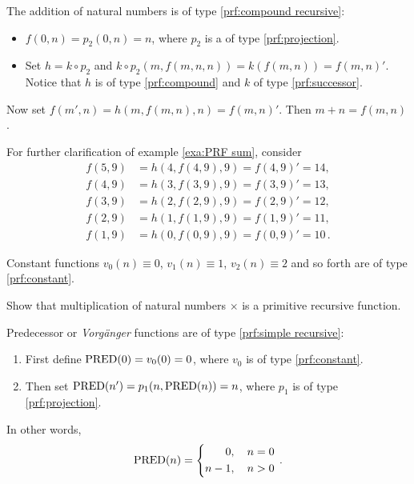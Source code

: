 \documentclass[11pt,a4paper]{article}
\begin{document}
\begin{example}[II]\label{exa:PRF sum}
    The addition of natural numbers is
    of type \eqref{prf:compound recursive}:
    \begin{itemize}
        \item \(f(0,n) = p_2(0,n) = n\), where \(p_2\)
            is a \PRF{} of type \eqref{prf:projection}.
        \item
            Set \(h = k\circ p_2\) and
            \(k\circ p_2(m,f(m,n,n)) = k(f(m,n)) = f(m,n)'\).
            Notice that \(h\) is of type \eqref{prf:compound}
            and \(k\) of type \eqref{prf:successor}.
    \end{itemize}
    Now set \(f(m',n) = h(m, f(m,n),n) = f(m,n)'\).
    Then \(m+n = f(m,n)\).
\end{example}

For further clarification of example \ref{exa:PRF sum}, consider
\begin{align*}
    f(5,9) &= h(4,f(4,9),9) = f(4,9)' = 14, \\
    f(4,9) &= h(3,f(3,9),9) = f(3,9)' = 13, \\
    f(3,9) &= h(2,f(2,9),9) = f(2,9)' = 12, \\
    f(2,9) &= h(1,f(1,9),9) = f(1,9)' = 11, \\
    f(1,9) &= h(0,f(0,9),9) = f(0,9)' = 10 \,.
\end{align*}

\begin{example}[III]\label{exa:PRF constant}
    Constant functions \(v_0(n)\equiv 0\),
    \(v_1(n)\equiv 1\), \(v_2(n)\equiv 2\) and so forth
    are of type \eqref{prf:constant}.
\end{example}

\begin{exercise}[10.2.1]\label{exe:10.2.1}
    Show that multiplication of natural numbers \(\times\)
    is a primitive recursive function.
\end{exercise}

\begin{example}[V]\label{exa:PRF predecessor}
    Predecessor or \emph{Vorgänger} functions
    are of type \eqref{prf:simple recursive}:
    \begin{enumerate}
        \item First define \(\operatorname{PRED}(0) = v_0(0) = 0\),
            where \(v_0\) is of type \eqref{prf:constant}.
        \item Then set \(\operatorname{PRED}(n') = p_1(n,\operatorname{PRED}(n)) = n\),
            where \(p_1\) is of type \eqref{prf:projection}.
    \end{enumerate}
    In other words,
    \begin{equation*}
        \operatorname{PRED}(n) =
        \left\{
            \begin{aligned}
                0&, \quad n=0\\
                n-1&,\quad n>0
            \end{aligned}
        \right.\,.
    \end{equation*}
\end{example}
\end{document}
